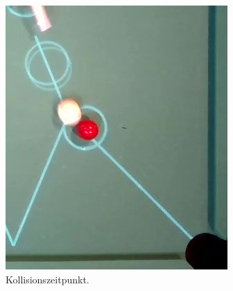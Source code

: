 \begin{figure}[h!]
\begin{subfigure}[t]{0.2\textwidth}
        \includegraphics[width=1.0\linewidth]{../common/04_results/resources/simulation_vs_reality/video_12_0205_0208_collision_cut.jpg}
        \caption{Kollisionszeitpunkt.}
        \label{fig:video_12_0205_0208_collision}
    \end{subfigure}
    \hfill
    \begin{subfigure}[t]{0.2\textwidth}
        \centering

\end{subfigure}
\end{figure}
